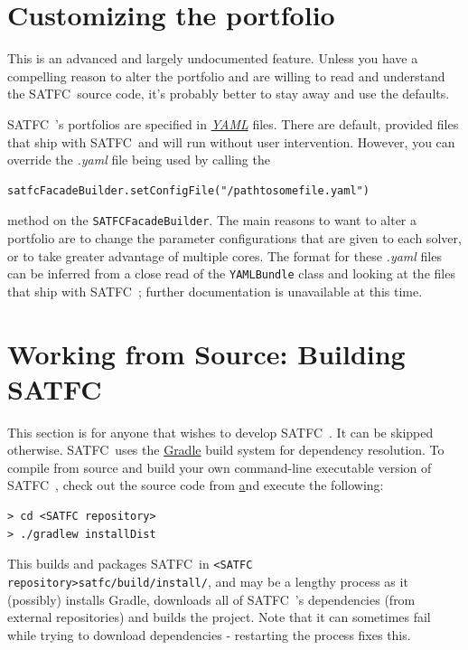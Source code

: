 \documentclass[
10pt, %
letterpaper, %
oneside, %
headinclude,footinclude, %
BCOR5mm, %
needspace, %
]{scrartcl}
\newcommand{\SATFC}{\textsc{SATFC}~}
\begin{document}
\section{Customizing the portfolio}\label{sec:customportfolio}
\begin{fwarning}
	This is an advanced and largely undocumented feature. Unless you have a compelling reason to alter the portfolio and are willing to read and understand the \SATFC source code, it's probably better to stay away and use the defaults. 
\end{fwarning}
\SATFC's portfolios are specified in \href{http://yaml.org/}{\emph{YAML}} files. There are default, provided files that ship with \SATFC and will run without user intervention. However, you can override the \emph{.yaml} file being used by calling the 
\begin{verbatim}
satfcFacadeBuilder.setConfigFile("/pathtosomefile.yaml")
\end{verbatim}
method on the \texttt{SATFCFacadeBuilder}. The main reasons to want to alter a portfolio are to change the parameter configurations that are given to each solver, or to take greater advantage of multiple cores. The format for these \emph{.yaml} files can be inferred from a close read of the \texttt{YAMLBundle} class and looking at the files that ship with \SATFC; further documentation is unavailable at this time.

\section{Working from Source: Building \SATFC}

This section is for anyone that wishes to develop \SATFC. It can be skipped otherwise. \SATFC uses the \href{http://www.gradle.org/}{Gradle} build system for dependency resolution. To compile from source and build your own command-line executable version of \SATFC, check out the source code from \href{https://github.com/FCC/SATFC} and execute the following:
\begin{lstlisting}[style=Bash]
> cd <SATFC repository>
> ./gradlew installDist
\end{lstlisting}
This builds and packages \SATFC in \texttt{<SATFC repository>satfc/build/install/}, and may be a lengthy process as it (possibly) installs Gradle, downloads all of \SATFC's dependencies (from external repositories) and builds the project. Note that it can sometimes fail while trying to download dependencies - restarting the process fixes this. 
\end{document}
